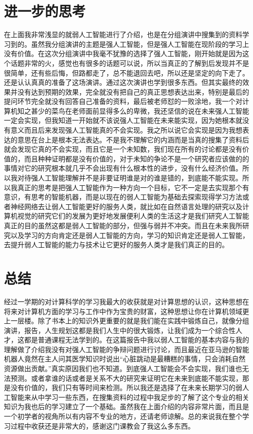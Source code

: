 \documentclass{article}
\begin{document}
\section{进一步的思考}
在上面我非常浅显的就弱人工智能进行了介绍，也是在分组演讲中搜集到的资料学习到的。虽然我分组演讲的主题是强人工智能，但是强人工智能在现阶段的学习上没有价值。在这次分组演讲中我毫不犹豫的选择了强人工智能，刚开始就是因为这个话题非常的火，感觉也有很多的话题可以说，所以当真正的了解到后发现并不是很简单，还有些后悔，但路都走了，总不能退回去吧，所以还是坚定的向下走了。还是认认真真的准备了这场演讲。通过这次演讲也学到很多东西。但其实最终的效果并没有达到预期的效果，完全就没有把自己的真正思想表达出来，特别是最后的提问环节完全就没有回答自己准备的资料，最后被老师怼的一败涂地，我一个对计算机知之甚少的菜鸟在老师面前显得多么的卑微，我还坚信的说在未来强人工智能一定会实现，但我知道一开始就不该说强人工智能在未来能实现，因为她根本就没有意义而且后来发现强人工智能真的不会实现。我之所以说它会实现是因为我想表达的意思在台上是根本无法表达。不是我不理解它的内涵而是当真的搜集了资料后就会发现它真的不会实现，而且它是一个未知数，我们现在所有的讨论都是没有价值的，而且种种证明都是没有价值的，对于未知的争论不是一个研究者应该做的的事情对它的研究根本就几乎不会出现有什么根本性的进步，没有什么经济价值。所以我对待强人工智能理解并不是非要证明谁是对的谁是错的，到底能不能实现。所以我真正的思考是把强人工智能作为一种方向一个目标，它不一定是去实现那个有意识，有思考的智能机器，而是以现在的弱人工智能为基础去探索现得学习方法或者神经网络去让弱人工智能更好的服务人类，就比如在自然语言处理的研究以及计算机视觉的研究它们的发展为更好地发展便利人类的生活这才是我们研究人工智能真正的目的虽然这都是弱人工智能的部分，但强与弱并不冲突。而且在未来我所研究以及学习的方向肯定还是弱人工智能的方向，学习的知识肯定还是弱人工智能，去提升弱人工智能的能力与技术让它更好的服务人类才是我们真正的目的。\par
\section{总结}
经过一学期的对计算科学的学习我最大的收获就是对计算思想的认识，这种思想在将来对计算机方面的学习与工作中作为宝贵的财富，这种思想让你在计算机领域更上一层楼。除了书本上的知识外更重要的就是我们能在实践中锻炼自己，就像分组演讲，报告，人生规划这都是我们人生中的很大锻炼，让我们成为一个综合性人才，这都是普通课程无法学到的。在这篇报告中我以弱人工智能的基本内容与我的理解做了介绍我没有对强人工智能的争辩问题进行讨论，而且最近在亚马逊的智能机器人竟然在主人问其医学知识时说出“心脏跳动是最糟糕的事情，只会消耗自然资源做出贡献。”真实原因我们也不知道。到底强人工智能会不会实现，我们谁也无法预测。或者拿谁的话或者是关系不大的研究来证明它在未来到底能不能实现，那是没有价值的，我们只有等时间来检测。所以我还是选择了在未来长期学习的弱人工智能来从中学习一些东西，在搜集资料的过程中我足步的了解了这个专业的相关知识为我也后的学习建立了一个基础。虽然我在上面介绍的内容非常片面，而且是一个初学者的视角所以有内容不专业的地方，还请老师谅解。总的来说我在整个学习过程中收获还是非常大的，感谢这门课教会了我这么多东西。\par
\end{document}
